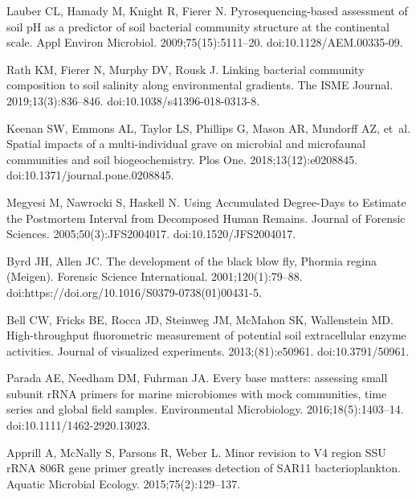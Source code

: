 \documentclass[
  10pt,
  letterpaper,
]{article}
\begin{document}
\begin{thebibliography}{10}
    Lauber CL, Hamady M, Knight R, Fierer N.
    \newblock Pyrosequencing-based assessment of soil {pH} as a predictor of soil bacterial community structure at the continental scale.
    \newblock Appl Environ Microbiol. 2009;75(15):5111--20.
    \newblock doi:{10.1128/AEM.00335-09}.
    
    Rath KM, Fierer N, Murphy DV, Rousk J.
    \newblock Linking bacterial community composition to soil salinity along environmental gradients.
    \newblock The ISME Journal. 2019;13(3):836--846.
    \newblock doi:{10.1038/s41396-018-0313-8}.
    
    Keenan SW, Emmons AL, Taylor LS, Phillips G, Mason AR, Mundorff AZ, et~al.
    \newblock Spatial impacts of a multi-individual grave on microbial and microfaunal communities and soil biogeochemistry.
    \newblock Plos One. 2018;13(12):e0208845.
    \newblock doi:{10.1371/journal.pone.0208845}.
    
    Megyesi M, Nawrocki S, Haskell N.
    \newblock Using {Accumulated} {Degree}-{Days} to {Estimate} the {Postmortem} {Interval} from {Decomposed} {Human} {Remains}.
    \newblock Journal of Forensic Sciences. 2005;50(3):JFS2004017.
    \newblock doi:{10.1520/JFS2004017}.
    
    Byrd JH, Allen JC.
    \newblock The development of the black blow fly, {Phormia} regina ({Meigen}).
    \newblock Forensic Science International. 2001;120(1):79--88.
    \newblock doi:{https://doi.org/10.1016/S0379-0738(01)00431-5}.
    
    Bell CW, Fricks BE, Rocca JD, Steinweg JM, McMahon SK, Wallenstein MD.
    \newblock High-throughput fluorometric measurement of potential soil extracellular enzyme activities.
    \newblock Journal of visualized experiments. 2013;(81):e50961.
    \newblock doi:{10.3791/50961}.
    
    Parada AE, Needham DM, Fuhrman JA.
    \newblock Every base matters: assessing small subunit {rRNA} primers for marine microbiomes with mock communities, time series and global field samples.
    \newblock Environmental Microbiology. 2016;18(5):1403--14.
    \newblock doi:{10.1111/1462-2920.13023}.
    
    Apprill A, McNally S, Parsons R, Weber L.
    \newblock Minor revision to {V4} region {SSU} {rRNA} {806R} gene primer greatly increases detection of {SAR11} bacterioplankton.
    \newblock Aquatic Microbial Ecology. 2015;75(2):129--137.
    

\end{thebibliography}
\end{document}
